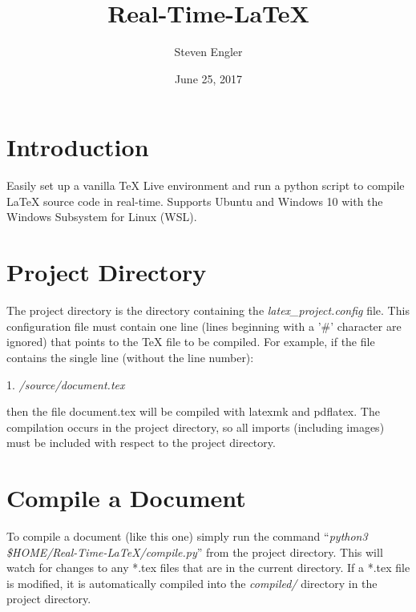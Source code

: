\documentclass[12pt]{article}
\title{Real-Time-\LaTeX{}}
\author{Steven Engler}
\date{June 25, 2017}
\begin{document}
\maketitle

\section{Introduction}
Easily set up a vanilla TeX Live environment and run a python script to compile LaTeX source code in real-time. Supports Ubuntu and Windows 10 with the Windows Subsystem for Linux (WSL).

\section{Project Directory}
The project directory is the directory containing the \textit{latex\_project.config} file. This configuration file must contain one line (lines beginning with a '\#' character are ignored) that points to the \TeX{} file to be compiled. For example, if the file contains the single line (without the line number):

\vspace*{0.5\baselineskip}
1. \textit{/source/document.tex}
\vspace*{0.5\baselineskip}

\noindent then the file document.tex will be compiled with latexmk and pdflatex. The compilation occurs in the project directory, so all imports (including images) must be included with respect to the project directory.

\section{Compile a Document}
To compile a document (like this one) simply run the command ``\textit{python3 \$HOME/Real-Time-LaTeX/compile.py}'' from the project directory. This will watch for changes to any *.tex files that are in the current directory. If a *.tex file is modified, it is automatically compiled into the \textit{compiled/} directory in the project directory.
\end{document}
